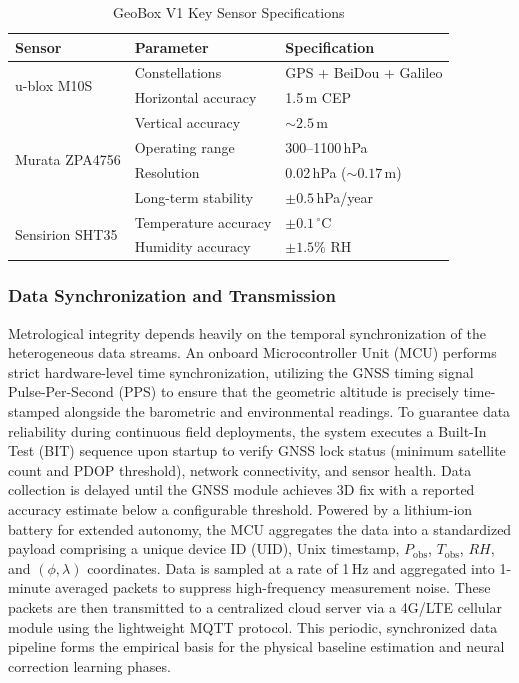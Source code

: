 \begin{table}[t]
\caption{GeoBox V1 Key Sensor Specifications}
\label{tab:hardware_specs}
\centering
\small
\begin{tabular}{lll}
\toprule
\textbf{Sensor} & \textbf{Parameter} & \textbf{Specification} \\
\midrule
\multirow{2}{*}{u-blox M10S} & Constellations & GPS + BeiDou + Galileo \\
 & Horizontal accuracy & 1.5\,m CEP \\
 & Vertical accuracy & ${\sim}2.5$\,m \\
\midrule
\multirow{2}{*}{Murata ZPA4756} & Operating range & 300--1100\,hPa \\
 & Resolution & 0.02\,hPa (${\sim}0.17$\,m) \\
 & Long-term stability & $\pm0.5$\,hPa/year \\
\midrule
\multirow{2}{*}{Sensirion SHT35} & Temperature accuracy & $\pm0.1\,^{\circ}$C \\
 & Humidity accuracy & $\pm1.5\%$ RH \\
\bottomrule
\end{tabular}
\end{table}


\subsubsection{Data Synchronization and Transmission}
Metrological integrity depends heavily on the temporal synchronization of the heterogeneous data streams. An onboard Microcontroller Unit (MCU) performs strict hardware-level time synchronization, utilizing the GNSS timing signal Pulse-Per-Second (PPS) to ensure that the geometric altitude is precisely time-stamped alongside the barometric and environmental readings. To guarantee data reliability during continuous field deployments, the system executes a Built-In Test (BIT) sequence upon startup to verify GNSS lock status (minimum satellite count and PDOP threshold), network connectivity, and sensor health. Data collection is delayed until the GNSS module achieves 3D fix with a reported accuracy estimate below a configurable threshold. Powered by a lithium-ion battery for extended autonomy, the MCU aggregates the data into a standardized payload comprising a unique device ID (UID), Unix timestamp, $P_\text{obs}$, $T_\text{obs}$, $RH$, and $(\phi, \lambda)$ coordinates. Data is sampled at a rate of 1\,Hz and aggregated into 1-minute averaged packets to suppress high-frequency measurement noise. These packets are then transmitted to a centralized cloud server via a 4G/LTE cellular module using the lightweight MQTT protocol. This periodic, synchronized data pipeline forms the empirical basis for the physical baseline estimation and neural correction learning phases.

